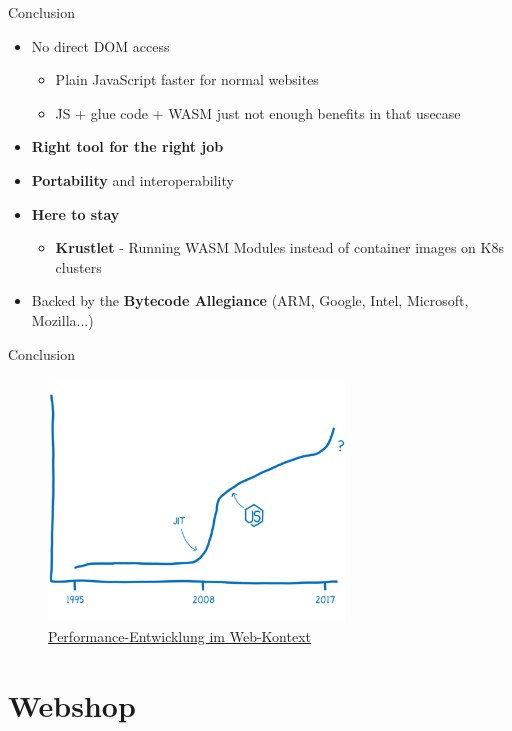 \documentclass{beamer}
\begin{document}
\begin{frame}{Conclusion}
\begin{itemize}
    \item No direct DOM access 
    \begin{itemize} 
        \item Plain JavaScript faster for normal websites 
        \item JS + glue code + WASM just not enough benefits in that usecase 
    \end{itemize}
    \item \textbf{Right tool for the right job}
    \item \textbf{Portability} and interoperability
    \item \textbf{Here to stay}
    \begin{itemize}
        \item \textbf{Krustlet} - Running WASM Modules instead of container images on K8s clusters
    \end{itemize}
    \item Backed by the \textbf{Bytecode Allegiance} (ARM, Google, Intel, Microsoft, Mozilla...)
\end{itemize}
\end{frame}

\begin{frame}{Conclusion}
    \begin{figure}
        \includegraphics[width=0.7\textwidth,height=0.7\textheight]{./images/perf_history.png}
        \caption{\href{https://hacks.mozilla.org/2017/02/a-cartoon-intro-to-webassembly/}{Performance-Entwicklung im Web-Kontext}}
    \end{figure}
\end{frame}

\section{Webshop}
    
\end{document}

